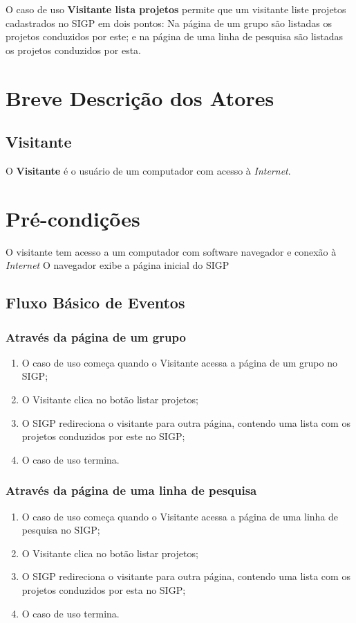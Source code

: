 \documentclass[11pt, a4paper,oneside]{book}
\begin{document}
O caso de uso \textbf{Visitante lista projetos} permite que um visitante liste projetos cadastrados no SIGP em dois pontos: Na página de um grupo são listadas os projetos conduzidos por este; e na página de uma linha de pesquisa são listadas os projetos conduzidos por esta.

\section{Breve Descrição dos Atores}

\subsection{Visitante}

O \textbf{Visitante} é o usuário de um computador com acesso à \emph{Internet}.

\section{Pré-condições}
O visitante tem acesso a um computador com software navegador e conexão à \emph{Internet}
O navegador exibe a página inicial do SIGP

\subsection{Fluxo Básico de Eventos}

\subsubsection{Através da página de um grupo}
\begin{enumerate}
\item O caso de uso começa quando o Visitante acessa a página de um grupo no SIGP;
\item O Visitante clica no botão listar projetos;
\item O SIGP redireciona o visitante para outra página, contendo uma lista com os projetos conduzidos por este no SIGP;
\item O caso de uso termina.
\end{enumerate}

\subsubsection{Através da página de uma linha de pesquisa}
\begin{enumerate}
\item O caso de uso começa quando o Visitante acessa a página de uma linha de pesquisa no SIGP;
\item O Visitante clica no botão listar projetos;
\item O SIGP redireciona o visitante para outra página, contendo uma lista com os projetos conduzidos por esta no SIGP;
\item O caso de uso termina.
\end{enumerate}
\end{document}
